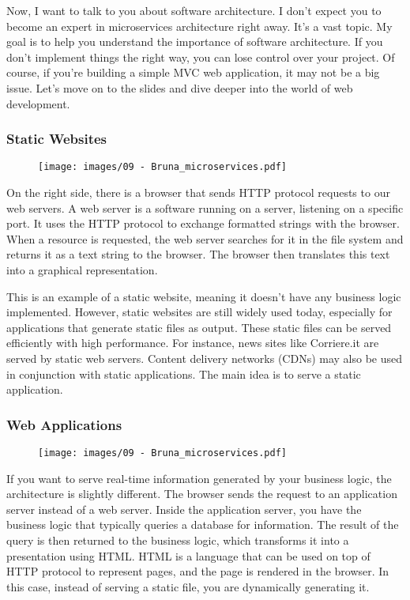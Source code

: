 Now, I want to talk to you about software architecture. I don't expect
you to become an expert in microservices architecture right away. It's a
vast topic. My goal is to help you understand the importance of software
architecture. If you don't implement things the right way, you can lose
control over your project. Of course, if you're building a simple MVC
web application, it may not be a big issue. Let's move on to the slides
and dive deeper into the world of web development.

\subsubsection{Static Websites}

\begin{figure}[!h]
  \centering
  \texttt{[image: images/09 - Bruna\_microservices.pdf]}
\end{figure}

On the right side, there is a browser that sends HTTP protocol requests
to our web servers. A web server is a software running on a server,
listening on a specific port. It uses the HTTP protocol to exchange
formatted strings with the browser. When a resource is requested, the
web server searches for it in the file system and returns it as a text
string to the browser. The browser then translates this text into a
graphical representation.

This is an example of a static website, meaning it doesn't have any
business logic implemented. However, static websites are still widely
used today, especially for applications that generate static files as
output. These static files can be served efficiently with high
performance. For instance, news sites like Corriere.it are served by
static web servers. Content delivery networks (CDNs) may also be used in
conjunction with static applications. The main idea is to serve a static
application.

\subsubsection{Web Applications}

\begin{figure}[!h]
  \centering
  \texttt{[image: images/09 - Bruna\_microservices.pdf]}
\end{figure}

If you want to serve real-time information generated by your business
logic, the architecture is slightly different. The browser sends the
request to an application server instead of a web server. Inside the
application server, you have the business logic that typically queries a
database for information. The result of the query is then returned to
the business logic, which transforms it into a presentation using
HTML. HTML is a language that can be used on top of HTTP protocol to
represent pages, and the page is rendered in the browser. In this case,
instead of serving a static file, you are dynamically generating it.

